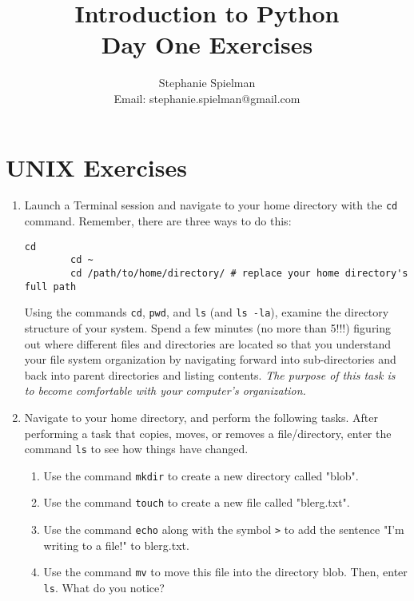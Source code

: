 \documentclass{article}[12pt]
\newcommand{\code}[1]{\texttt{#1}}  %
\begin{document}
\title{Introduction to Python \\ Day One Exercises}
\author{Stephanie Spielman \\ \footnotesize{Email: stephanie.spielman@gmail.com}}
\date{}
\maketitle{}

\section{UNIX Exercises}

\begin{enumerate}[itemsep=5ex]
	\item Launch a Terminal session and navigate to your home directory with the \code{cd} command. Remember, there are three ways to do this:
		\begin{Verbatim}[fontsize=\small,xleftmargin=-2.5cm,commandchars=+\[\]]
		cd
		cd ~
		cd /path/to/home/directory/ # replace your home directory's full path
		\end{Verbatim}
		Using the commands \code{cd}, \code{pwd}, and \code{ls} (and \code{ls -la}), examine the directory structure of your system. Spend a few minutes (no more than 5!!!) figuring out where different files and directories are located so that you understand your file system organization by navigating forward into sub-directories and back into parent directories and listing contents. \emph{The purpose of this task is to become comfortable with your computer's organization.}
	
	\item Navigate to your home directory, and perform the following tasks. After performing a task that copies, moves, or removes a file/directory, enter the command \code{ls} to see how things have changed.
	\begin{enumerate}[itemsep=2ex]
		\item Use the command \code{mkdir} to create a new directory called "blob".
		
		\item Use the command \code{touch} to create a new file called "blerg.txt".
		
		\item Use the command \code{echo} along with the symbol \code{>} to add the sentence "I'm writing to a file!" to blerg.txt.
		
		\item Use the command \code{mv} to move this file into the directory blob. Then, enter \code{ls}. What do you notice?
		

\end{enumerate}
\end{enumerate}
\end{document}
